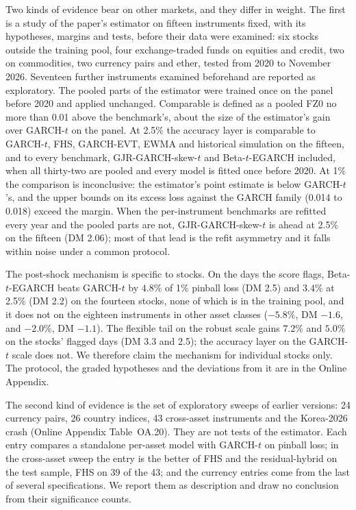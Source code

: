 \documentclass[11pt]{article}
\theoremstyle{remark}
\begin{document}
Two kinds of evidence bear on other markets, and they differ in weight. The first is a study of the paper's estimator on fifteen instruments fixed, with its hypotheses, margins and tests, before their data were examined: six stocks outside the training pool, four exchange-traded funds on equities and credit, two on commodities, two currency pairs and ether, tested from 2020 to November 2026. Seventeen further instruments examined beforehand are reported as exploratory. The pooled parts of the estimator were trained once on the panel before 2020 and applied unchanged. Comparable is defined as a pooled FZ0 no more than 0.01 above the benchmark's, about the size of the estimator's gain over GARCH-$t$ on the panel. At 2.5\% the accuracy layer is comparable to GARCH-$t$, FHS, GARCH-EVT, EWMA and historical simulation on the fifteen, and to every benchmark, GJR-GARCH-skew-$t$ and Beta-$t$-EGARCH included, when all thirty-two are pooled and every model is fitted once before 2020. At 1\% the comparison is inconclusive: the estimator's point estimate is below GARCH-$t$'s, and the upper bounds on its excess loss against the GARCH family (0.014 to 0.018) exceed the margin. When the per-instrument benchmarks are refitted every year and the pooled parts are not, GJR-GARCH-skew-$t$ is ahead at 2.5\% on the fifteen (DM 2.06); most of that lead is the refit asymmetry and it falls within noise under a common protocol.

The post-shock mechanism is specific to stocks. On the days the score flags, Beta-$t$-EGARCH beats GARCH-$t$ by $4.8\%$ of 1\% pinball loss (DM 2.5) and $3.4\%$ at 2.5\% (DM 2.2) on the fourteen stocks, none of which is in the training pool, and it does not on the eighteen instruments in other asset classes ($-5.8\%$, DM $-1.6$, and $-2.0\%$, DM $-1.1$). The flexible tail on the robust scale gains $7.2\%$ and $5.0\%$ on the stocks' flagged days (DM 3.3 and 2.5); the accuracy layer on the GARCH-$t$ scale does not. We therefore claim the mechanism for individual stocks only. The protocol, the graded hypotheses and the deviations from it are in the Online Appendix.

The second kind of evidence is the set of exploratory sweeps of earlier versions: 24 currency pairs, 26 country indices, 43 cross-asset instruments and the Korea-2026 crash (Online Appendix Table~OA.20). They are not tests of the estimator. Each entry compares a standalone per-asset model with GARCH-$t$ on pinball loss; in the cross-asset sweep the entry is the better of FHS and the residual-hybrid on the test sample, FHS on 39 of the 43; and the currency entries come from the last of several specifications. We report them as description and draw no conclusion from their significance counts.
\end{document}
